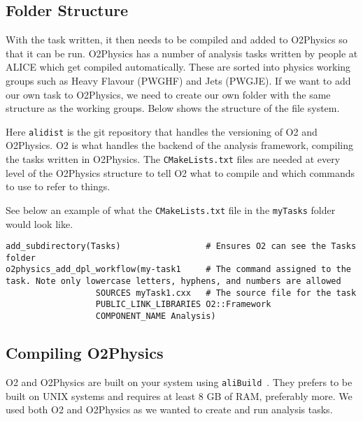 \subsection{Folder Structure}\label{sec:FolderStructure}
With the task written, it then needs to be compiled and added to O2Physics so that it can be run. O2Physics has a number of analysis tasks written by people at ALICE which get compiled automatically. These are sorted into physics working groups such as Heavy Flavour (PWGHF) and Jets (PWGJE). If we want to add our own task to O2Physics, we need to create our own folder with the same structure as the working groups. Below shows the structure of the file system.

\newpage
{}

Here \texttt{alidist} is the git repository that handles the versioning of O2 and O2Physics. O2 is what handles the backend of the analysis framework, compiling the tasks written in O2Physics. The \texttt{CMakeLists.txt} files are needed at every level of the O2Physics structure to tell O2 what to compile and which commands to use to refer to things. 

See below an example of what the \texttt{CMakeLists.txt} file in the \texttt{myTasks} folder would look like.

\begin{verbatim}
add_subdirectory(Tasks)                 # Ensures O2 can see the Tasks folder
o2physics_add_dpl_workflow(my-task1     # The command assigned to the task. Note only lowercase letters, hyphens, and numbers are allowed
                  SOURCES myTask1.cxx   # The source file for the task
                  PUBLIC_LINK_LIBRARIES O2::Framework
                  COMPONENT_NAME Analysis)
\end{verbatim}

\subsection{Compiling O2Physics}\label{sec:CompileO2Physics}
O2 and O2Physics are built on your system using \texttt{aliBuild}~\cite{aliBuild_install}. They prefers to be built on UNIX systems and requires at least 8 GB of RAM, preferably more. We used both O2 and O2Physics as we wanted to create and run analysis tasks. 

